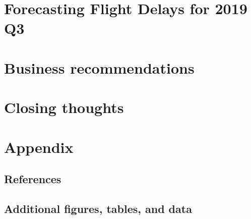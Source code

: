 \documentclass[12pt, a4paper]{book}
\begin{document}
\chapter{Forecasting Flight Delays for 2019 Q3}
\chapter{Business recommendations}
\chapter{Closing thoughts}
\chapter{Appendix}
	\section{References}
	\section{Additional figures, tables, and data}
\pagebreak


\nocite{*}

\end{document}
